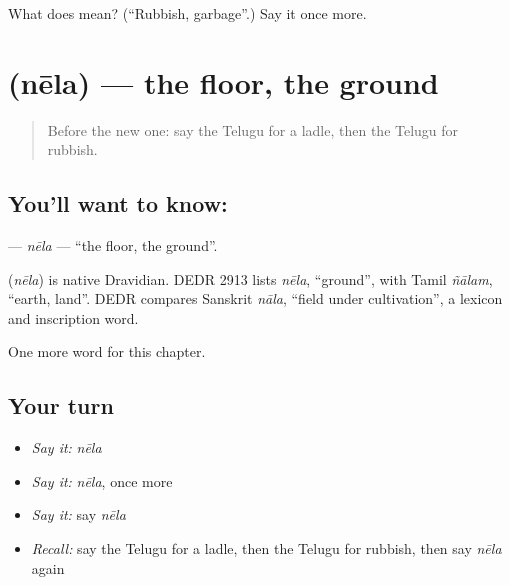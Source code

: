 \begin{tcolorbox}[breakable,colback=teal!4,colframe=teal!35!black,title={Before you move on}]
What does  mean? (\textquotedblleft{}Rubbish, garbage\textquotedblright{}.) Say it once more.
\end{tcolorbox}
\section[\texorpdfstring{\te{నేల} (nēla)}{నేల (nēla)}]{ (nēla) — the floor, the ground}

\label{lesson:TE-C224-nela}



\begin{quote}
Before the new one: say the Telugu for a ladle, then the Telugu for rubbish.
\end{quote}

\subsection*{You'll want to know: }
\textbf{} — \emph{nēla} — \textquotedblleft{}the floor, the ground\textquotedblright{}.

\begin{cousinweb}
\textbf{} (\emph{nēla}) is native Dravidian. DEDR 2913 lists \emph{nēla}, \textquotedblleft{}ground\textquotedblright{}, with Tamil \emph{ñālam}, \textquotedblleft{}earth, land\textquotedblright{}. DEDR compares Sanskrit \emph{nāla}, \textquotedblleft{}field under cultivation\textquotedblright{}, a lexicon and inscription word.
\end{cousinweb}

\begin{grammarlens}[title={What you've built}]
One more word for this chapter.
\end{grammarlens}

\subsection*{Your turn}
\begin{itemize}
\raggedright
  \item \emph{Say it:} \emph{nēla}
  \item \emph{Say it:} \emph{nēla}, once more
  \item \emph{Say it:} say \emph{nēla}
  \item \emph{Recall:} say the Telugu for a ladle, then the Telugu for rubbish, then say \emph{nēla} again
\end{itemize}

